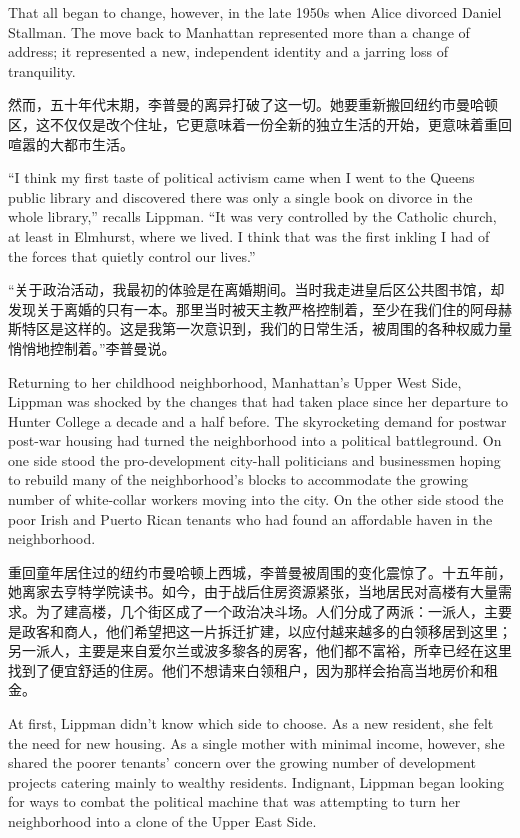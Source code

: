 \ifdefined\eng
That all began to change, however, in the late 1950s when Alice divorced Daniel Stallman. The move back to Manhattan represented more than a change of address; it represented a new, independent identity and a jarring loss of tranquility.
\fi

\ifdefined\chs
然而，五十年代末期，李普曼的离异打破了这一切。她要重新搬回纽约市曼哈顿区，这不仅仅是改个住址，它更意味着一份全新的独立生活的开始，更意味着重回喧嚣的大都市生活。
\fi

\ifdefined\eng
``I think my first taste of political activism came when I went to the Queens public library and discovered there was only a single book on divorce in the whole library,'' recalls Lippman. ``It was very controlled by the Catholic church, at least in Elmhurst, where we lived. I think that was the first inkling I had of the forces that quietly control our lives.''
\fi

\ifdefined\chs
``关于政治活动，我最初的体验是在离婚期间。当时我走进皇后区公共图书馆，却发现关于离婚的只有一本。那里当时被天主教严格控制着，至少在我们住的阿母赫斯特区是这样的。这是我第一次意识到，我们的日常生活，被周围的各种权威力量悄悄地控制着。''李普曼说。
\fi

\ifdefined\eng
Returning to her childhood neighborhood, Manhattan's Upper West Side, Lippman was shocked by the changes that had taken place since her departure to Hunter College a decade and a half before. The skyrocketing demand for \ifdefined\vone postwar \fi\ifdefined\vtwo post-war \fi housing had turned the neighborhood into a political battleground. On one side stood the pro-development city-hall politicians and businessmen hoping to rebuild many of the neighborhood's blocks to accommodate the growing number of white-collar workers moving into the city. On the other side stood the poor Irish and Puerto Rican tenants who had found an affordable haven in the neighborhood.
\fi

\ifdefined\chs
重回童年居住过的纽约市曼哈顿上西城，李普曼被周围的变化震惊了。十五年前，她离家去亨特学院读书。如今，由于战后住房资源紧张，当地居民对高楼有大量需求。为了建高楼，几个街区成了一个政治决斗场。人们分成了两派：一派人，主要是政客和商人，他们希望把这一片拆迁扩建，以应付越来越多的白领移居到这里；另一派人，主要是来自爱尔兰或波多黎各的房客，他们都不富裕，所幸已经在这里找到了便宜舒适的住房。他们不想请来白领租户，因为那样会抬高当地房价和租金。
\fi

\ifdefined\eng
At first, Lippman didn't know which side to choose. As a new resident, she felt the need for new housing. As a single mother with minimal income, however, she shared the poorer tenants' concern over the growing number of development projects catering mainly to wealthy residents. Indignant, Lippman began looking for ways to combat the political machine that was attempting to turn her neighborhood into a clone of the Upper East Side.
\fi

